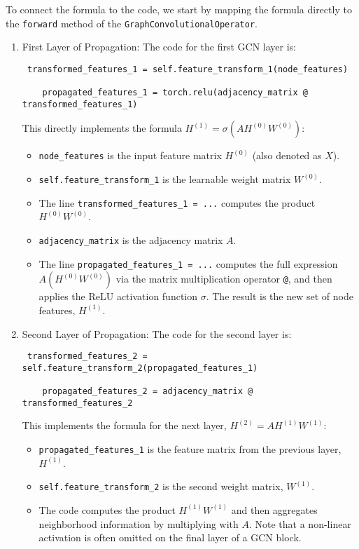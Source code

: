 \documentclass{article}
\begin{document}
To connect the formula to the code, we start by mapping the formula directly to the \texttt{forward} method of the \texttt{GraphConvolutionalOperator}. 
\begin{enumerate}
    \item First Layer of Propagation: The code for the first GCN layer is: 
    \begin{verbatim} transformed_features_1 = self.feature_transform_1(node_features) 
    
    propagated_features_1 = torch.relu(adjacency_matrix @ transformed_features_1) \end{verbatim} 
    
    This directly implements the formula $H^{(1)} = \sigma(A H^{(0)} W^{(0)})$: 
    \begin{itemize} \item \texttt{node\_features} is the input feature matrix $H^{(0)}$ (also denoted as $X$). \item \texttt{self.feature\_transform\_1} is the learnable weight matrix $W^{(0)}$. \item The line \texttt{transformed\_features\_1 = ...} computes the product $H^{(0)}W^{(0)}$. \item \texttt{adjacency\_matrix} is the adjacency matrix $A$. \item The line \texttt{propagated\_features\_1 = ...} computes the full expression $A(H^{(0)}W^{(0)})$ via the matrix multiplication operator \texttt{@}, and then applies the ReLU activation function $\sigma$. The result is the new set of node features, $H^{(1)}$. 
    \end{itemize}
    \item Second Layer of Propagation: The code for the second layer is: 
    \begin{verbatim} transformed_features_2 = self.feature_transform_2(propagated_features_1) 
 
    propagated_features_2 = adjacency_matrix @ transformed_features_2 \end{verbatim} 
    
    This implements the formula for the next layer, $H^{(2)} = A H^{(1)} W^{(1)}$: \begin{itemize} \item \texttt{propagated\_features\_1} is the feature matrix from the previous layer, $H^{(1)}$. \item \texttt{self.feature\_transform\_2} is the second weight matrix, $W^{(1)}$. \item The code computes the product $H^{(1)}W^{(1)}$ and then aggregates neighborhood information by multiplying with $A$. Note that a non-linear activation is often omitted on the final layer of a GCN block. 


\end{itemize}
\end{enumerate}
\end{document}
